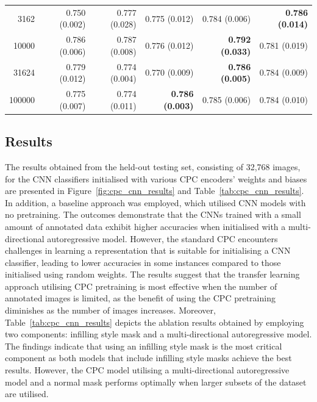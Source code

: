 \begin{table}[h]
{\begin{tabular}{r|rrrrr}
			3162   & 0.750 (0.002) & 0.777 (0.028)          & 0.775 (0.012)          & 0.784 (0.006)          & \textbf{0.786 (0.014)} \\
			10000  & 0.786 (0.006) & 0.787 (0.008)          & 0.776 (0.012)          & \textbf{0.792 (0.033)} & 0.781 (0.019)          \\
			31624  & 0.779 (0.012) & 0.774 (0.004)          & 0.770 (0.009)          & \textbf{0.786 (0.005)} & 0.784 (0.009)          \\
			100000 & 0.775 (0.007) & 0.774 (0.011)          & \textbf{0.786 (0.003)} & 0.785 (0.006)          & 0.784 (0.010)
		\end{tabular}%
	}
\end{table}

\subsection{Results}
\label{subsec:unsupervised_results}
The results obtained from the held-out testing set, consisting of 32,768 images, for the CNN classifiers initialised with various CPC encoders' weights and biases are presented in Figure~\ref{fig:cpc_cnn_results} and Table~\ref{tab:cpc_cnn_results}. In addition, a baseline approach was employed, which utilised CNN models with no pretraining. The outcomes demonstrate that the CNNs trained with a small amount of annotated data exhibit higher accuracies when initialised with a multi-directional autoregressive model. However, the standard CPC encounters challenges in learning a representation that is suitable for initialising a CNN classifier, leading to lower accuracies in some instances compared to those initialised using random weights. The results suggest that the transfer learning approach utilising CPC pretraining is most effective when the number of annotated images is limited, as the benefit of using the CPC pretraining diminishes as the number of images increases. Moreover, Table~\ref{tab:cpc_cnn_results} depicts the ablation results obtained by employing two components: infilling style mask and a multi-directional autoregressive model. The findings indicate that using an infilling style mask is the most critical component as both models that include infilling style masks achieve the best results. However, the CPC model utilising a multi-directional autoregressive model and a normal mask performs optimally when larger subsets of the dataset are utilised.

